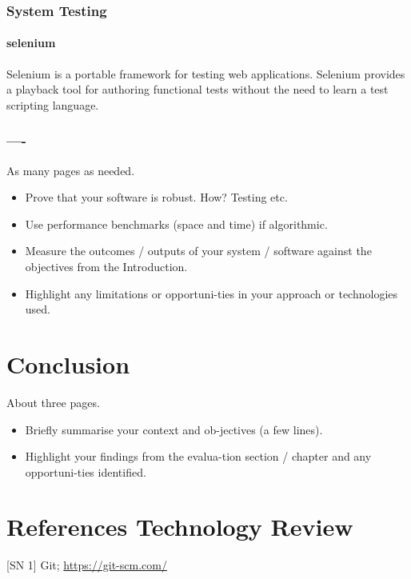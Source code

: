 \subsection{System Testing}
\subsubsection{selenium}
Selenium is a portable framework for testing web applications. Selenium provides a playback tool for authoring functional tests without the need to learn a test scripting language.



















\subsection{----}
As many pages as needed.
\begin{itemize}
\item Prove that your software is robust. How? Testing etc. 
\item Use performance benchmarks (space and time) if algorithmic.
\item Measure the outcomes / outputs of your system / software against the objectives from the Introduction.
\item Highlight any limitations or opportuni-ties in your approach or technologies used.
\end{itemize}

\chapter{Conclusion}
About three pages.

\begin{itemize}
\item Briefly summarise your context and ob-jectives (a few lines).
\item Highlight your findings from the evalua-tion section / chapter and any opportuni-ties identified.
\end{itemize}

\chapter{References Technology Review}
[SN 1] Git; \url{https://git-scm.com/}



